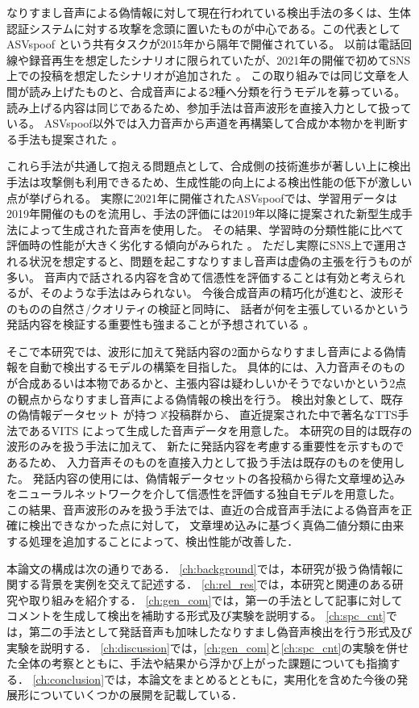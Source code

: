 なりすまし音声による偽情報に対して現在行われている検出手法の多くは、生体認証システムに対する攻撃を念頭に置いたものが中心である。この代表としてASVspoof \cite{7858696,kinnunen17_interspeech,todisco19_interspeech}という共有タスクが2015年から隔年で開催されている。
以前は電話回線や録音再生を想定したシナリオに限られていたが、2021年の開催で初めてSNS上での投稿を想定したシナリオが追加された \cite{yamagishi21_asvspoof}。
この取り組みでは同じ文章を人間が読み上げたものと、合成音声による2種へ分類を行うモデルを募っている。
読み上げる内容は同じであるため、参加手法は音声波形を直接入力として扱っている\cite{jung20c_interspeech,9746213}。
ASVspoof以外では入力音声から声道を再構築して合成か本物かを判断する手法も提案された \cite{280020}。

これら手法が共通して抱える問題点として、合成側の技術進歩が著しい上に検出手法は攻撃側も利用できるため、生成性能の向上による検出性能の低下が激しい点が挙げられる。
実際に2021年に開催されたASVspoofでは、学習用データは2019年開催のものを流用し、手法の評価には2019年以降に提案された新型生成手法によって生成された音声を使用した。
その結果、学習時の分類性能に比べて評価時の性能が大きく劣化する傾向がみられた \cite{yamagishi21_asvspoof,yu_icmece}。
ただし実際にSNS上で運用される状況を想定すると、問題を起こすなりすまし音声は虚偽の主張を行うものが多い。
音声内で話される内容を含めて信憑性を評価することは有効と考えられるが、そのような手法はみられない。
今後合成音声の精巧化が進むと、波形そのものの自然さ/クオリティの検証と同時に、
話者が何を主張しているかという発話内容を検証する重要性も強まることが予想されている \cite{10208955}。

そこで本研究では、波形に加えて発話内容の2面からなりすまし音声による偽情報を自動で検出するモデルの構築を目指した。
具体的には、入力音声そのものが合成あるいは本物であるかと、主張内容は疑わしいかそうでないかという2点の観点からなりすまし音声による偽情報の検出を行う。
検出対象として、既存の偽情報データセット \cite{10.1145/3477495.3531744}が持つ $\mathbb{X}$投稿群から、
直近提案された中で著名なTTS手法であるVITS \cite{pmlr-v139-kim21f}によって生成した音声データを用意した。
本研究の目的は既存の波形のみを扱う手法に加えて、
新たに発話内容を考慮する重要性を示すものであるため、
入力音声そのものを直接入力として扱う手法は既存のものを使用した。
発話内容の使用には、偽情報データセットの各投稿から得た文章埋め込みをニューラルネットワークを介して信憑性を評価する独自モデルを用意した。
この結果、音声波形のみを扱う手法では、直近の合成音声手法による偽音声を正確に検出できなかった点に対して，
文章埋め込みに基づく真偽二値分類に由来する処理を追加することによって、検出性能が改善した．


本論文の構成は次の通りである．
\cref{ch:background}では，本研究が扱う偽情報に関する背景を実例を交えて記述する．
\cref{ch:rel_res}では，本研究と関連のある研究や取り組みを紹介する．
\cref{ch:gen_com}では，第一の手法として記事に対してコメントを生成して検出を補助する形式及び実験を説明する。
\cref{ch:spc_cnt}では，第二の手法として発話音声も加味したなりすまし偽音声検出を行う形式及び実験を説明する．
\cref{ch:discussion}では，\cref{ch:gen_com}と\cref{ch:spc_cnt}の実験を併せた全体の考察とともに、手法や結果から浮かび上がった課題についても指摘する．
\cref{ch:conclusion}では，本論文をまとめるとともに，実用化を含めた今後の発展形についていくつかの展開を記載している．
